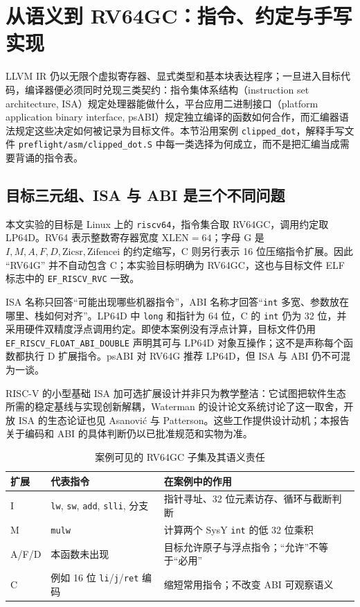 \section{从语义到 RV64GC：指令、约定与手写实现}
\label{sec:riscv}

LLVM IR 仍以无限个虚拟寄存器、显式类型和基本块表达程序；一旦进入目标代码，编译器便必须同时兑现三类契约：指令集体系结构（instruction set architecture, ISA）规定处理器能做什么，平台应用二进制接口（platform application binary interface, psABI）规定独立编译的函数如何合作，而汇编器语法规定这些决定如何被记录为目标文件。本节沿用案例 \texttt{clipped\_dot}，解释手写文件 \texttt{preflight/asm/clipped\_dot.S} 中每一类选择为何成立，而不是把汇编当成需要背诵的指令表。

\subsection{目标三元组、ISA 与 ABI 是三个不同问题}

本文实验的目标是 Linux 上的 \texttt{riscv64}，指令集合取 RV64GC，调用约定取 LP64D。RV64 表示整数寄存器宽度 \(\mathrm{XLEN}=64\)；字母 G 是 \(I,M,A,F,D,\mathrm{Zicsr},\mathrm{Zifencei}\) 的约定缩写，C 则另行表示 16 位压缩指令扩展\cite{bin-riscv-unpriv,bin-riscv-naming}。因此 ``RV64G'' 并不自动包含 C；本实验目标明确为 RV64GC，这也与目标文件 ELF 标志中的 \texttt{EF\_RISCV\_RVC} 一致。

ISA 名称只回答“可能出现哪些机器指令”，ABI 名称才回答“\texttt{int} 多宽、参数放在哪里、栈如何对齐”。LP64D 中 \texttt{long} 和指针为 64 位，C 的 \texttt{int} 仍为 32 位，并采用硬件双精度浮点调用约定。即使本案例没有浮点计算，目标文件仍用 \texttt{EF\_RISCV\_FLOAT\_ABI\_DOUBLE} 声明其可与 LP64D 对象互操作；这不是声称每个函数都执行 D 扩展指令。psABI 对 RV64G 推荐 LP64D，但 ISA 与 ABI 仍不可混为一谈\cite{bin-riscv-psabi}。

RISC-V 的小型基础 ISA 加可选扩展设计并非只为教学整洁：它试图把软件生态所需的稳定基线与实现创新解耦，Waterman 的设计论文系统讨论了这一取舍\cite{bin-waterman-riscv}，开放 ISA 的生态论证也见 Asanovi{\'c} 与 Patterson\cite{bin-asanovic-riscv}。这些工作提供设计动机；本报告关于编码和 ABI 的具体判断仍以已批准规范和实物为准。

\begin{table}[t]
\caption{案例可见的 RV64GC 子集及其语义责任}
\label{tab:rvext}
\centering
\small
\begin{tabular}{p{.12\linewidth}p{.30\linewidth}p{.48\linewidth}}
\hline
扩展 & 代表指令 & 在案例中的作用\\
\hline
I & \texttt{lw}, \texttt{sw}, \texttt{add}, \texttt{slli}, 分支 & 指针寻址、32 位元素访存、循环与截断判断\\
M & \texttt{mulw} & 计算两个 SysY \texttt{int} 的低 32 位乘积\\
A/F/D & 本函数未出现 & 目标允许原子与浮点指令；“允许”不等于“必用”\\
C & 例如 16 位 \texttt{li}/\texttt{j}/\texttt{ret} 编码 & 缩短常用指令；不改变 ABI 可观察语义\\
\hline
\end{tabular}
\end{table}

